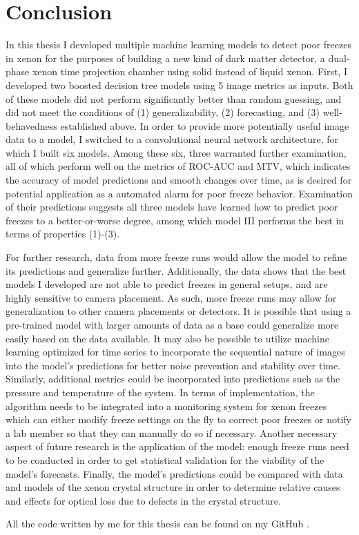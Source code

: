 \documentclass{article}
\begin{document}
\section*{Conclusion}

In this thesis I developed multiple machine learning models to detect poor freezes in xenon for the purposes of building a new kind of dark matter detector, a dual-phase xenon time projection chamber using solid instead of liquid xenon. First, I developed two boosted decision tree models using 5 image metrics as inputs. Both of these models did not perform significantly better than random guessing, and did not meet the conditions of (1) generalizability, (2) forecasting, and (3) well-behavedness established above. In order to provide more potentially useful image data to a model, I switched to a convolutional neural network architecture, for which I built six models. Among these six, three warranted further examination, all of which perform well on the metrics of ROC-AUC and MTV, which indicates the accuracy of model predictions and smooth changes over time, as is desired for potential application as a automated alarm for poor freeze behavior. Examination of their predictions suggests all three models have learned how to predict poor freezes to a better-or-worse degree, among which model III performs the best in terms of properties (1)-(3).

For further research, data from more freeze runs would allow the model to refine its predictions and generalize further. Additionally, the data shows that the best models I developed are not able to predict freezes in general setups, and are highly sensitive to camera placement. As such, more freeze runs may allow for generalization to other camera placements or detectors. It is possible that using a pre-trained model with larger amounts of data as a base could generalize more easily based on the data available. It may also be possible to utilize machine learning optimized for time series to incorporate the sequential nature of images into the model's predictions for better noise prevention and stability over time. Similarly, additional metrics could be incorporated into predictions such as the pressure and temperature of the system. In terms of implementation, the algorithm needs to be integrated into a monitoring system for xenon freezes which can either modify freeze settings on the fly to correct poor freezes or notify a lab member so that they can manually do so if necessary. Another necessary aspect of future research is the application of the model: enough freeze runs need to be conducted in order to get statistical validation for the viability of the model's forecasts. Finally, the model's predictions could be compared with data and models of the xenon crystal structure in order to determine relative causes and effects for optical loss due to defects in the crystal structure.

All the code written by me for this thesis can be found on my GitHub \cite{EvieGitHub}.



\end{document}
